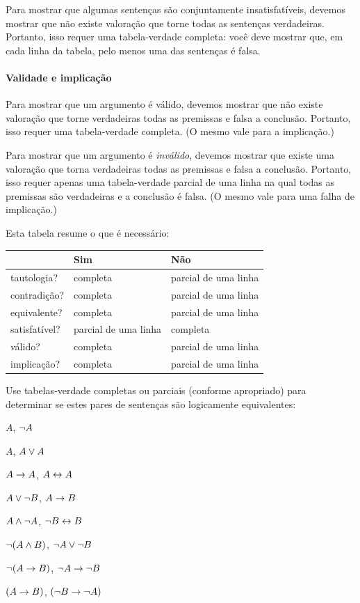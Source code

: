 Para mostrar que algumas sentenças são conjuntamente insatisfatíveis, devemos mostrar que não existe valoração que torne todas as sentenças verdadeiras. Portanto, isso requer uma tabela-verdade completa: você deve mostrar que, em cada linha da tabela, pelo menos uma das sentenças é falsa.

\paragraph{Validade e implicação}
Para mostrar que um argumento é válido, devemos mostrar que não existe valoração que torne verdadeiras todas as premissas e falsa a conclusão. Portanto, isso requer uma tabela-verdade completa. (O mesmo vale para a implicação.)

Para mostrar que um argumento é \emph{inválido}, devemos mostrar que existe uma valoração que torna verdadeiras todas as premissas e falsa a conclusão. Portanto, isso requer apenas uma tabela-verdade parcial de uma linha na qual todas as premissas são verdadeiras e a conclusão é falsa. (O mesmo vale para uma falha de implicação.)

Esta tabela resume o que é necessário:

\begin{center}
\begin{tabular}{l l l}
 & \textbf{Sim} & \textbf{Não}\\
 \hline
tautologia? & completa & parcial de uma linha \\
contradição? &  completa & parcial de uma linha \\
equivalente? & completa  & parcial de uma linha \\
satisfatível? & parcial de uma linha & completa \\
válido? & completa & parcial de uma linha \\
implicação? & completa & parcial de uma linha\\
\end{tabular}
\end{center}
\label{table.CompleteVsPartial}


\practiceproblems

\problempart
\label{pr.TT.equiv3}
Use tabelas-verdade completas ou parciais (conforme apropriado) para determinar se estes pares de sentenças são logicamente equivalentes:
\begin{compactlist}
\item $A$, $\neg A$ %
\item $A$, $A \vee A$ %
\item $A\rightarrow A$, $A \leftrightarrow A$ %
\item $A \vee \neg B$, $A\rightarrow B$ %
\item $A \wedge \neg A$, $\neg B \leftrightarrow B$ %
\item $\neg(A \wedge B)$, $\neg A \vee \neg B$ %
\item $\neg(A \rightarrow B)$, $\neg A \rightarrow \neg B$ %
\item $(A \rightarrow B)$, $(\neg B \rightarrow \neg A)$ %
\end{compactlist}

